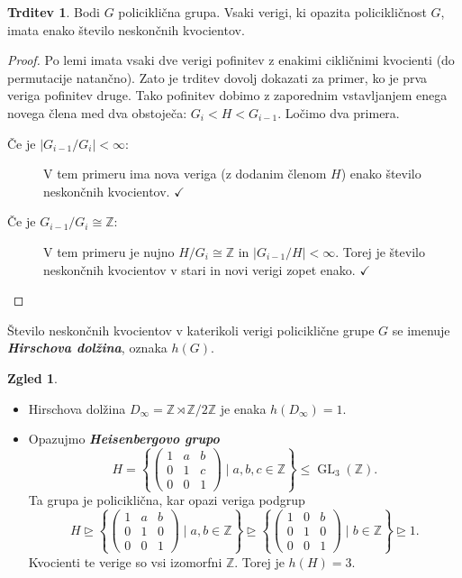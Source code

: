 \documentclass[11pt]{book}
\def\ZZ{\mathbb{Z}}
\DeclareMathOperator\GL{GL}
\def\definicija{\color{rdeca}\bf\em}
\def\kljuka{$\checkmark$}
\theoremstyle{definition}
\theoremstyle{zgled}
\newtheorem*{zgled}{Zgled}
\theoremstyle{odprtproblem}
\theoremstyle{domacanaloga}
\newenvironment{dokaz}
    {\color{siva}\begin{proof}}
    {\end{proof}}
\theoremstyle{izrek}
\newtheorem*{trditev}{Trditev}
\begin{document}
\begin{trditev}
Bodi $G$ policiklična grupa. Vsaki verigi, ki opazita policikličnost $G$, imata enako število neskončnih kvocientov.
\end{trditev}

\begin{dokaz}
Po lemi imata vsaki dve verigi pofinitev z enakimi cikličnimi kvocienti (do permutacije natančno). Zato je trditev dovolj dokazati za primer, ko je prva veriga pofinitev druge. Tako pofinitev dobimo z zaporednim vstavljanjem enega novega člena med dva obstoječa: $G_i < H < G_{i-1}$. Ločimo dva primera.
\begin{description}
    \item[Če je $|G_{i-1}/G_i| < \infty$:] V tem primeru ima nova veriga (z dodanim členom $H$) enako število neskončnih kvocientov. \kljuka
    \item[Če je $G_{i-1}/G_i \cong \ZZ$:] V tem primeru je nujno $H/G_i \cong \ZZ$ in $|G_{i-1}/H| < \infty$. Torej je število neskončnih kvocientov v stari in novi verigi zopet enako. \kljuka 
\end{description}
\end{dokaz}

Število neskončnih kvocientov v katerikoli verigi policiklične grupe $G$ se imenuje {\definicija Hirschova dolžina}, oznaka $h(G)$.

\begin{zgled}
\begin{itemize}
    \item Hirschova dolžina $D_\infty = \ZZ \rtimes \ZZ/2\ZZ$ je enaka $h(D_\infty) = 1$.
    \item Opazujmo {\definicija Heisenbergovo grupo}
    \[
    H = \left\{ \begin{pmatrix}
    1 & a & b \\ 0 & 1 & c \\ 0 & 0 & 1
    \end{pmatrix} \mid a,b,c \in \ZZ \right\} \leq \GL_3(\ZZ).
    \]
    Ta grupa je policiklična, kar opazi veriga podgrup
    \[
    H \unrhd 
    \left\{ \begin{pmatrix}
    1 & a & b \\ 0 & 1 & 0 \\ 0 & 0 & 1
    \end{pmatrix} \mid a,b \in \ZZ \right\}
    \unrhd
    \left\{ \begin{pmatrix}
    1 & 0 & b \\ 0 & 1 & 0 \\ 0 & 0 & 1
    \end{pmatrix} \mid b \in \ZZ \right\}
    \unrhd 1.
    \]
    Kvocienti te verige so vsi izomorfni $\ZZ$. Torej je $h(H) = 3$.
\end{itemize}
\end{zgled}
\end{document}
